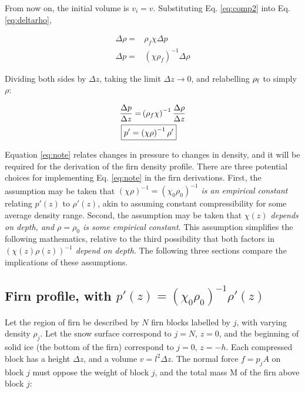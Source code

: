 \documentclass[12pt]{article}
\begin{document}
From now on, the initial volume is $v_i = v$.  Substituting Eq. \ref{eq:comp2} into Eq. \ref{eq:deltarho}, 

\begin{align}
\Delta \rho =& \rho_{f} \chi \Delta p \\
\Delta p =& \left(\chi \rho_{f}\right)^{-1} \Delta \rho
\end{align}

Dividing both sides by $\Delta z$, taking the limit $\Delta z \to 0$, and relabelling $\rho_{\rm f}$ to simply $\rho$:

\begin{align}
\frac{\Delta p}{\Delta z} =& \left(\rho_{f} \chi \right)^{-1} \frac{\Delta \rho}{\Delta z} \\
\Aboxed{p' =& \left(\chi \rho\right)^{-1} \rho'} \label{eq:note}
\end{align}

Equation \ref{eq:note} relates changes in pressure to changes in density, and it will be required for the derivation of the firn density profile.  There are three potential choices for implementing Eq. \ref{eq:note} in the firn derivations.  First, the assumption may be taken that \textit{$\left(\chi \rho\right)^{-1} = \left(\chi_0 \rho_0\right)^{-1}$ is an empirical constant} relating $p'(z)$ to $\rho'(z)$, akin to assuming constant compressibility for some average density range.  Second, the assumption may be taken that \textit{$\chi(z)$ depends on depth, and $\rho=\rho_0$ is some empirical constant}.  This assumption simplifies the following mathematics, relative to the third possibility that both factors in \textit{$(\chi(z)\rho(z))^{-1}$ depend on depth}.  The following three sections compare the implications of these assumptions.

\subsection{Firn profile, with $p'(z) = (\chi_0\rho_0)^{-1} \rho'(z)$}
\label{sec:firn1}

Let the region of firn be described by $N$ firn blocks labelled by $j$, with varying density $\rho_j$.  Let the snow surface correspond to $j=N$, $z=0$, and the beginning of solid ice (the bottom of the firn) correspond to $j=0$, $z=-h$.  Each compressed block has a height $\Delta z$, and a volume $v = l^2\Delta z$.  The normal force $f = p_{j} A$ on block $j$ must oppose the weight of block $j$, and the total mass M of the firn above block $j$:
\end{document}
